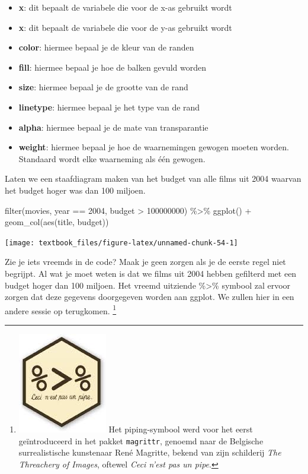 \documentclass[]{tufte-book}
\newenvironment{Shaded}{}{}
\newcommand{\DecValTok}[1]{\textcolor[rgb]{0.25,0.63,0.44}{#1}}
\newcommand{\FunctionTok}[1]{\textcolor[rgb]{0.02,0.16,0.49}{#1}}
\newcommand{\NormalTok}[1]{#1}
\newcommand{\SpecialCharTok}[1]{\textcolor[rgb]{0.25,0.44,0.63}{#1}}
\providecommand{\tightlist}{%
  \setlength{\itemsep}{0pt}\setlength{\parskip}{0pt}}
\begin{document}
\begin{itemize}
\tightlist
\item
  \textbf{x}: dit bepaalt de variabele die voor de x-as gebruikt wordt
\item
  \textbf{x}: dit bepaalt de variabele die voor de y-as gebruikt wordt
\item
  \textbf{color}: hiermee bepaal je de kleur van de randen
\item
  \textbf{fill}: hiermee bepaal je hoe de balken gevuld worden
\item
  \textbf{size}: hiermee bepaal je de grootte van de rand
\item
  \textbf{linetype}: hiermee bepaal je het type van de rand
\item
  \textbf{alpha}: hiermee bepaal je de mate van transparantie
\item
  \textbf{weight}: hiermee bepaal je hoe de waarnemingen gewogen moeten worden. Standaard wordt elke waarneming als één gewogen.
\end{itemize}

Laten we een staafdiagram maken van het budget van alle films uit 2004 waarvan het budget hoger was dan 100 miljoen.

\begin{Shaded}
\begin{Highlighting}[]
\FunctionTok{filter}\NormalTok{(movies, year }\SpecialCharTok{==} \DecValTok{2004}\NormalTok{, budget }\SpecialCharTok{\textgreater{}} \DecValTok{100000000}\NormalTok{) }\SpecialCharTok{\%\textgreater{}\%}
  \FunctionTok{ggplot}\NormalTok{() }\SpecialCharTok{+}
  \FunctionTok{geom\_col}\NormalTok{(}\FunctionTok{aes}\NormalTok{(title, budget))}
\end{Highlighting}
\end{Shaded}

\texttt{[image: textbook\_files/figure-latex/unnamed-chunk-54-1]}

Zie je iets vreemds in de code? Maak je geen zorgen als je de eerste regel niet begrijpt. Al wat je moet weten is dat we films uit 2004 hebben gefilterd met een budget hoger dan 100 miljoen. Het vreemd uitziende \%\textgreater\% symbool zal ervoor zorgen dat deze gegevens doorgegeven worden aan ggplot. We zullen hier in een andere sessie op terugkomen. \footnote{\includegraphics{images/pipe.jpg} Het piping-symbool werd voor het eerst geïntroduceerd in het pakket \texttt{magrittr}, genoemd naar de Belgische surrealistische kunstenaar René Magritte, bekend van zijn schilderij \emph{The Threachery of Images}, oftewel \emph{Ceci n'est pas un pipe}.}
\end{document}
